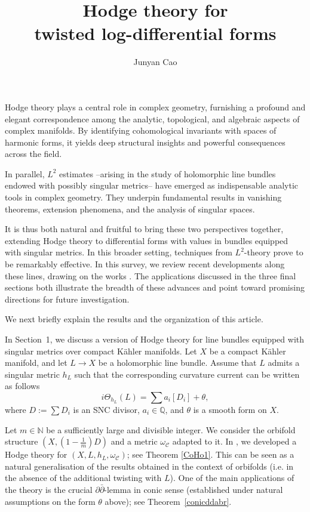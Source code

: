 \documentclass[english]{amsart}
\title{Hodge theory for \\ twisted log-differential forms}
\author[J. Cao]{Junyan Cao}
\newcommand{\ddbar}{\partial\bar{\partial}}
\newcommand{\cC}{\mathcal{C}}
\numberwithin{equation}{thm}
\begin{document}
 
	
	\maketitle


Hodge theory plays a central role in complex geometry, furnishing a profound and elegant correspondence among the analytic, topological, and algebraic aspects of complex manifolds. By identifying cohomological invariants with spaces of harmonic forms, it yields deep structural insights and powerful consequences across the field.

In parallel, \(L^2\) estimates --arising in the study of holomorphic line bundles endowed with possibly singular metrics-- have emerged as indispensable analytic tools in complex geometry. They underpin fundamental results in vanishing theorems, extension phenomena, and the analysis of singular spaces.

It is thus both natural and fruitful to bring these two perspectives together, extending Hodge theory to differential forms with values in bundles equipped with singular metrics. In this broader setting, techniques from 
\(L^2\)-theory prove to be remarkably effective. In this survey, we review recent developments along these lines, drawing on the works \cite{JCMP, CP-inv, CDHP}. The applications discussed in the three final sections both illustrate the breadth of these advances and point toward promising directions for future investigation.  
	
	\medskip
	
	We next briefly explain the results and the organization of this article.
	
	\medskip
	
	In Section~1, we discuss a version of Hodge theory for line bundles equipped with singular metrics over compact Kähler manifolds. 
	Let \(X\) be a compact K\"ahler manifold, and let \(L \to X\) be a holomorphic line bundle. Assume that \(L\) admits a singular metric \(h_L\) such that the corresponding curvature current can be written as follows
	\begin{equation}\label{singmetrin}
		i\Theta_{h_L}(L)=\sum a_i [D_i]+\theta,
	\end{equation}
	where \(D:=\sum D_i\) is an SNC divisor, \(a_i\in \mathbb Q\), and \(\theta\) is a smooth form on \(X\).
	
	Let \(m\in\mathbb N\) be a sufficiently large and divisible integer. We consider the orbifold structure \((X, (1 -\frac{1}{m}) D)\) and a metric \(\omega_\cC\) adapted to it. In \cite{JCMP}, we developed a Hodge theory for \((X,L,h_L, \omega_\cC)\); see Theorem \ref{CoHo1}. This can be seen as a natural generalisation of the results obtained in the context of orbifolds
	(i.e. in the absence of the additional twisting with $L$). 
	One of the main applications of the theory is the crucial \(\ddbar\)-lemma in conic sense (established under natural assumptions on the form \(\theta\) above); see Theorem~\ref{conicddabr}.
	
\end{document}
